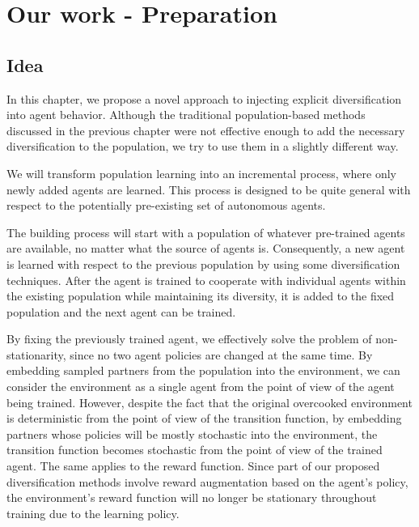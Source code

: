 \chapter{Our work - Preparation}

\section{Idea}
In this chapter, we propose a novel approach to injecting explicit diversification into agent behavior.
Although the traditional population-based methods discussed in the previous chapter were not effective enough to add the necessary diversification to the population, we try to use them in a slightly different way.

We will transform population learning into an incremental process, where only newly added agents are learned.
This process is designed to be quite general with respect to the potentially pre-existing set of autonomous agents.

The building process will start with a population of whatever pre-trained agents are available, no matter what the source of agents is.
Consequently, a new agent is learned with respect to the previous population by using some diversification techniques.
After the agent is trained to cooperate with individual agents within the existing population while maintaining its diversity, it is added to the fixed population and the next agent can be trained.

By fixing the previously trained agent, we effectively solve the problem of non-stationarity, since no two agent policies are changed at the same time.
By embedding sampled partners from the population into the environment, we can consider the environment as a single agent from the point of view of the agent being trained.
However, despite the fact that the original overcooked environment is deterministic from the point of view of the transition function, by embedding partners whose policies will be mostly stochastic into the environment, the transition function becomes stochastic from the point of view of the trained agent.
The same applies to the reward function.
Since part of our proposed diversification methods involve reward augmentation based on the agent's policy, the environment's reward function will no longer be stationary throughout training due to the learning policy.

